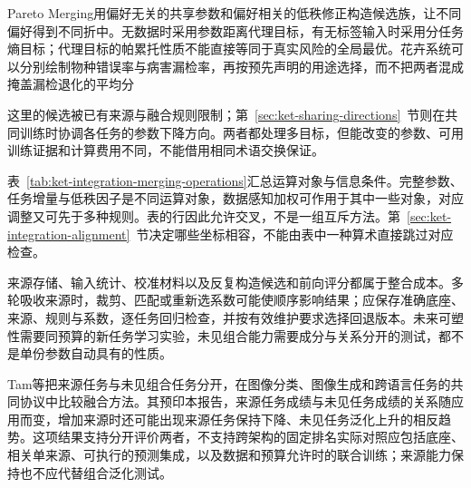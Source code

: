 Pareto Merging用偏好无关的共享参数和偏好相关的低秩修正构造候选族，让不同偏好得到不同折中。无数据时采用参数距离代理目标，有无标签输入时采用分任务熵目标；代理目标的帕累托性质不能直接等同于真实风险的全局最优。花卉系统可以分别绘制物种错误率与病害漏检率，再按预先声明的用途选择，而不把两者混成掩盖漏检退化的平均分

这里的候选被已有来源与融合规则限制；第~\ref{sec:ket-sharing-directions}~节则在共同训练时协调各任务的参数下降方向。两者都处理多目标，但能改变的参数、可用训练证据和计算费用不同，不能借用相同术语交换保证。

表~\ref{tab:ket-integration-merging-operations}汇总运算对象与信息条件。完整参数、任务增量与低秩因子是不同运算对象，数据感知加权可作用于其中一些对象，对应调整又可先于多种规则。表的行因此允许交叉，不是一组互斥方法。第~\ref{sec:ket-integration-alignment}~节决定哪些坐标相容，不能由表中一种算术直接跳过对应检查。

来源存储、输入统计、校准材料以及反复构造候选和前向评分都属于整合成本。多轮吸收来源时，裁剪、匹配或重新选系数可能使顺序影响结果；应保存准确底座、来源、规则与系数，逐任务回归检查，并按有效维护要求选择回退版本。未来可塑性需要同预算的新任务学习实验，未见组合能力需要成分与关系分开的测试，都不是单份参数自动具有的性质。

Tam等把来源任务与未见组合任务分开，在图像分类、图像生成和跨语言任务的共同协议中比较融合方法。其预印本报告，来源任务成绩与未见任务成绩的关系随应用而变，增加来源时还可能出现来源任务保持下降、未见任务泛化上升的相反趋势。这项结果支持分开评价两者，不支持跨架构的固定排名实际对照应包括底座、相关单来源、可执行的预测集成，以及数据和预算允许时的联合训练；来源能力保持也不应代替组合泛化测试。

